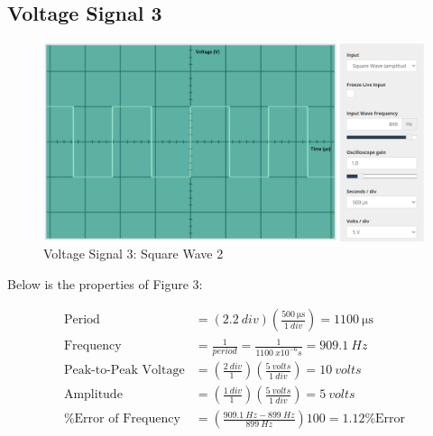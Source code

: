 \documentclass[12pt]{article}
\begin{document}
\subsection{Voltage Signal 3}
\begin{figure}[H]
    \begin{center}
        \includegraphics[scale=0.6]{Figure-3.png}
        \caption { Voltage Signal 3: Square Wave 2}
    \end{center}
\end{figure}

\newpage

Below is the properties of Figure 3:

\begin{equation*}
    \begin{split}
        \text{Period} & = (\SI{2.2}{div})\left(\frac{\SI{500}{\us}}{\SI{1}{div}}\right) = \SI{1100}{\us} \\
    \text{Frequency} & = \frac{1}{period} =\frac{1}{\SI{1100}{x10^{-6} s}} = \SI{909.1}{Hz} \\
        \text{Peak-to-Peak Voltage} & = \left(\frac{\SI{2}{div}}{\SI{1}{}}\right)\left(\frac{\SI{5}{volts}}{\SI{1}{div}}\right) = \SI{10}{volts} \\
        \text{Amplitude} & = \left(\frac{\SI{1}{div}}{\SI{1}{}}\right)\left(\frac{\SI{5}{volts}}{\SI{1}{div}}\right) = \SI{5}{volts} \\
        \text{\% Error of Frequency} & = \left(\frac{\SI{909.1}{Hz} - \SI{899}{Hz}}{\SI{899}{Hz}}\right)100 = 1.12 \text{\% Error}
    \end{split}
\end{equation*}
\end{document}
